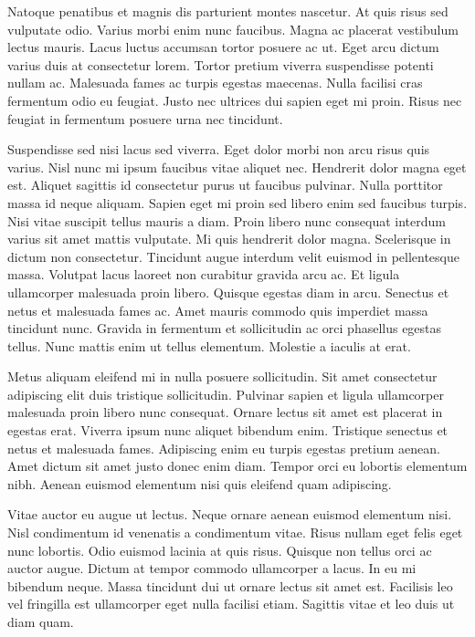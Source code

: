 \documentclass[11pt,a4paper]{article}
\begin{document}
Natoque penatibus et magnis dis parturient montes nascetur. At quis risus sed vulputate odio. Varius morbi enim nunc faucibus. Magna ac placerat vestibulum lectus mauris. Lacus luctus accumsan tortor posuere ac ut. Eget arcu dictum varius duis at consectetur lorem. Tortor pretium viverra suspendisse potenti nullam ac. Malesuada fames ac turpis egestas maecenas. Nulla facilisi cras fermentum odio eu feugiat. Justo nec ultrices dui sapien eget mi proin. Risus nec feugiat in fermentum posuere urna nec tincidunt.

Suspendisse sed nisi lacus sed viverra. Eget dolor morbi non arcu risus quis varius. Nisl nunc mi ipsum faucibus vitae aliquet nec. Hendrerit dolor magna eget est. Aliquet sagittis id consectetur purus ut faucibus pulvinar. Nulla porttitor massa id neque aliquam. Sapien eget mi proin sed libero enim sed faucibus turpis. Nisi vitae suscipit tellus mauris a diam. Proin libero nunc consequat interdum varius sit amet mattis vulputate. Mi quis hendrerit dolor magna. Scelerisque in dictum non consectetur. Tincidunt augue interdum velit euismod in pellentesque massa. Volutpat lacus laoreet non curabitur gravida arcu ac. Et ligula ullamcorper malesuada proin libero. Quisque egestas diam in arcu. Senectus et netus et malesuada fames ac. Amet mauris commodo quis imperdiet massa tincidunt nunc. Gravida in fermentum et sollicitudin ac orci phasellus egestas tellus. Nunc mattis enim ut tellus elementum. Molestie a iaculis at erat.

Metus aliquam eleifend mi in nulla posuere sollicitudin. Sit amet consectetur adipiscing elit duis tristique sollicitudin. Pulvinar sapien et ligula ullamcorper malesuada proin libero nunc consequat. Ornare lectus sit amet est placerat in egestas erat. Viverra ipsum nunc aliquet bibendum enim. Tristique senectus et netus et malesuada fames. Adipiscing enim eu turpis egestas pretium aenean. Amet dictum sit amet justo donec enim diam. Tempor orci eu lobortis elementum nibh. Aenean euismod elementum nisi quis eleifend quam adipiscing.

Vitae auctor eu augue ut lectus. Neque ornare aenean euismod elementum nisi. Nisl condimentum id venenatis a condimentum vitae. Risus nullam eget felis eget nunc lobortis. Odio euismod lacinia at quis risus. Quisque non tellus orci ac auctor augue. Dictum at tempor commodo ullamcorper a lacus. In eu mi bibendum neque. Massa tincidunt dui ut ornare lectus sit amet est. Facilisis leo vel fringilla est ullamcorper eget nulla facilisi etiam. Sagittis vitae et leo duis ut diam quam.
\end{document}
